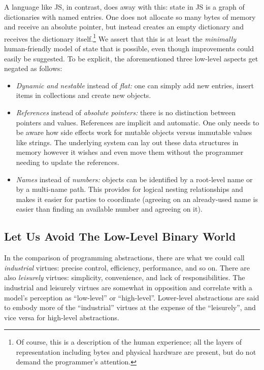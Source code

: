 \documentclass[ twoside,openright,titlepage,numbers=noenddot,headinclude,footinclude,cleardoublepage=empty,abstract=on,
                BCOR=5mm,paper=a4,fontsize=11pt
                ]{scrreprt}
\providecommand{\tightlist}{}\newenvironment{longtable}[2]{\begin{tabular}}{\end{tabular}}
\theoremstyle{definition}
\begin{document}
A language like \ac{JS}, in contrast, does away with this: state in
\ac{JS} is a graph of dictionaries with named entries. One does not
allocate so many bytes of memory and receive an absolute pointer, but
instead creates an empty dictionary and receives the dictionary
itself.\footnote{Of course, this is a description of the human
  experience; all the layers of representation including bytes and
  physical hardware are present, but do not demand the programmer's
  attention.} We assert that this is at least the \emph{minimally}
human-friendly model of state that is possible, even though improvements
could easily be suggested. To be explicit, the aforementioned three
low-level aspects get negated as follows:

\begin{itemize}
\tightlist
\item
  \emph{Dynamic and nestable} instead of \emph{flat:} one can simply add
  new entries, insert items in collections and create new objects.
\item
  \emph{References} instead of \emph{absolute pointers:} there is no
  distinction between pointers and values. References are implicit and
  automatic. One only needs to be aware how side effects work for
  mutable objects versus immutable values like strings. The underlying
  system can lay out these data structures in memory however it wishes
  and even move them without the programmer needing to update the
  references.
\item
  \emph{Names} instead of \emph{numbers:} objects can be identified by a
  root-level name or by a multi-name path. This provides for logical
  nesting relationships and makes it easier for parties to coordinate
  (agreeing on an already-used name is easier than finding an available
  number and agreeing on it).
\end{itemize}

\hypertarget{let-us-avoid-the-low-level-binary-world}{\subsection{Let Us Avoid The Low-Level Binary
World}\label{let-us-avoid-the-low-level-binary-world}}

In the comparison of programming abstractions, there are what we could
call \emph{industrial} virtues: precise control, efficiency,
performance, and so on. There are also \emph{leisurely} virtues:
simplicity, convenience, and lack of responsibilities. The industrial
and leisurely virtues are somewhat in opposition and correlate with a
model's perception as ``low-level'' or ``high-level''. Lower-level
abstractions are said to embody more of the ``industrial'' virtues at
the expense of the ``leisurely'', and vice versa for high-level
abstractions.
\end{document}
